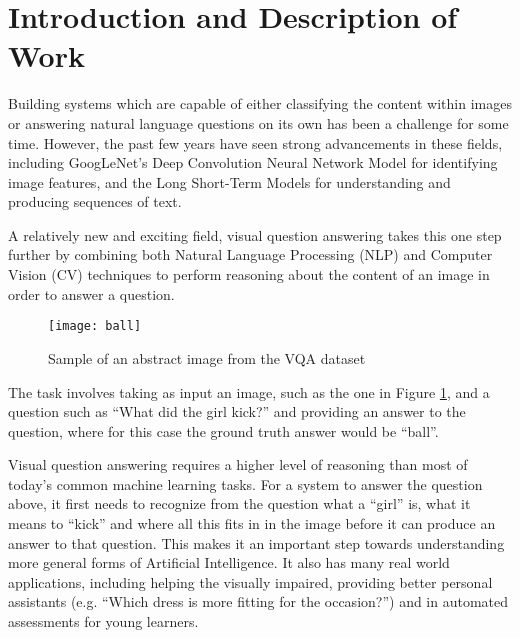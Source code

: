 \documentclass[12pt,a4paper,twoside]{article}
\begin{document}
\setlength{\parskip}{1em}
\setlength{\parindent}{0pt}
\titlespacing{\section}{0pt}{0.5pt}{0.4pt}
\titlespacing{\subsection}{0pt}{0.5pt}{0.4pt}
\titlespacing{\subsubsection}{0pt}{0.5pt}{0.4pt}
\selectfont 
\section{Introduction and Description of Work}
Building systems which are capable of either classifying the content within images or answering natural language questions on its own has been a challenge for some time. However, the past few years have seen strong advancements in these fields, including GoogLeNet’s Deep Convolution Neural Network Model for identifying image features\cite{CNN}, and the Long Short-Term Models for understanding and producing sequences of text\cite{LSTM}. 

A relatively new and exciting field, visual question answering takes this one step further by combining both Natural Language Processing (NLP) and Computer Vision (CV) techniques to perform reasoning about the content of an image in order to answer a question. 

\begin{figure}[h]
	\centering
	\texttt{[image: ball]}
	\caption{Sample of an abstract image from the VQA dataset}
	\label{fig:ball}
\end{figure}

The task involves taking as input an image, such as the one in Figure \ref{fig:ball}, and a question such as “What did the girl kick?” and providing an answer to the question, where for this case the ground truth answer would be “ball”. 

Visual question answering requires a higher level of reasoning than most of today’s common machine learning tasks. For a system to answer the question above, it first needs to recognize from the question what a “girl” is, what it means to “kick” and where all this fits in in the image before it can produce an answer to that question. This makes it an important step towards understanding more general forms of Artificial Intelligence. It also has many real world applications, including helping the visually impaired, providing better personal assistants (e.g. “Which dress is more fitting for the occasion?”) and in automated assessments for young learners. 
\end{document}

